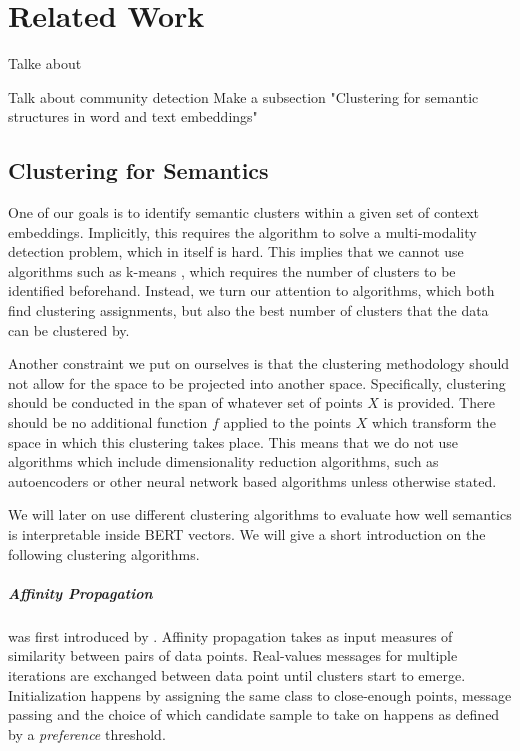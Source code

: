 \documentclass[a4paper,12pt,twoside,openright]{report}
\begin{document}
\chapter{Related Work}

Talke about \cite{mccarthy16}

Talk about community detection 
Make a subsection "Clustering for semantic structures in word and text embeddings"

\section{Clustering for Semantics}\label{section_clustering}

One of our goals is to identify semantic clusters within a given set of context embeddings.
Implicitly, this requires the algorithm to solve a multi-modality detection problem, which in itself is hard.
This implies that we cannot use algorithms such as k-means \cite{lloyd57, macqueen67}, which requires the number of clusters to be identified beforehand.
Instead, we turn our attention to algorithms, which both find clustering assignments, but also the best number of clusters that the data can be clustered by.

Another constraint we put on ourselves is that the clustering methodology should not allow for the space to be projected into another space.
Specifically, clustering should be conducted in the span of whatever set of points $X$ is provided.
There should be no additional function $f$ applied to the points $X$ which transform the space in which this clustering takes place.
This means that we do not use algorithms which include dimensionality reduction algorithms, such as autoencoders or other neural network based algorithms unless otherwise stated.

We will later on use different clustering algorithms to evaluate how well semantics is interpretable inside BERT vectors.
We will give a short introduction on the following clustering algorithms.

\paragraph{Affinity Propagation} was first introduced by \cite{frey07}.
Affinity propagation takes as input measures of similarity between pairs of data points. 
Real-values messages for multiple iterations are exchanged between data point until clusters start to emerge.
Initialization happens by assigning the same class to close-enough points, message passing and the choice of which candidate sample to take on happens as defined by a \textit{preference} threshold.
\end{document}
